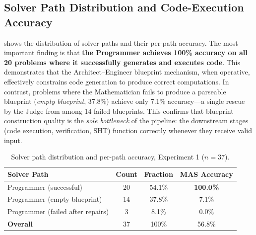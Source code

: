 \documentclass[11pt,a4paper]{article}
\begin{document}
\subsection{Solver Path Distribution and Code-Execution Accuracy}
 shows the distribution of solver paths and their per-path accuracy.
The most important finding is that \textbf{the Programmer achieves 100\% accuracy on all 20 problems where it successfully generates and executes code}.
This demonstrates that the Architect--Engineer blueprint mechanism, when operative, effectively constrains code generation to produce correct computations.
In contrast, problems where the Mathematician fails to produce a parseable blueprint (\textit{empty blueprint}, 37.8\%) achieve only 7.1\% accuracy---a single rescue by the Judge from among 14 failed blueprints.
This confirms that blueprint construction quality is the \emph{sole bottleneck} of the pipeline: the downstream stages (code execution, verification, SHT) function correctly whenever they receive valid input.
\begin{table}[h]
\centering
\caption{Solver path distribution and per-path accuracy, Experiment 1 ($n=37$).}
\label{tab:solver_agents}
\begin{tabular}{lccc}
\toprule
\textbf{Solver Path} & \textbf{Count} & \textbf{Fraction} & \textbf{MAS Accuracy} \\
\midrule
Programmer (successful)         & 20 & 54.1\% & \textbf{100.0\%} \\
Programmer (empty blueprint)    & 14 & 37.8\% & 7.1\%   \\
Programmer (failed after repairs) & 3 &  8.1\% & 0.0\%   \\
\midrule
\textbf{Overall}                & 37 & 100\%  & 56.8\%  \\
\bottomrule
\end{tabular}
\end{table}
\end{document}
